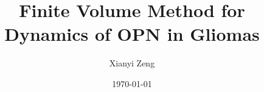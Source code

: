 \documentclass{amsart}
\theoremstyle{definition}
\theoremstyle{remark}
\numberwithin{equation}{section}
\numberwithin{figure}{section}
\begin{document}
\title[Numerical OPN Dynamics]{Finite Volume Method for Dynamics of OPN in Gliomas}
\author[X.~Zeng]{Xianyi Zeng}
\address{Department of Mathematical Sciences, University of Texas at El Paso, El Paso TX 79902, United States.\\
         Tel.: +1-915-747-6759}
\date{\today}




\maketitle
\end{document}
